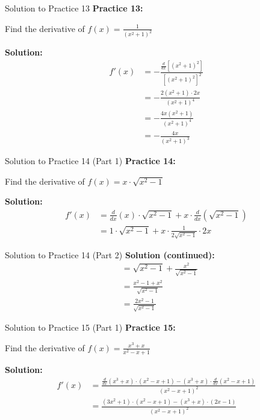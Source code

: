\documentclass[aspectratio=169]{beamer}
\begin{document}
\begin{frame}{Solution to Practice 13}
\textbf{Practice 13:}

Find the derivative of $f(x) = \frac{1}{(x^2 + 1)^2}$

\textbf{Solution:}
\[
\begin{aligned}
  f'(x) &= -\frac{\frac{d}{dx}[(x^2 + 1)^2]}{[(x^2 + 1)^2]^2} \\
  &= -\frac{2(x^2 + 1) \cdot 2x}{(x^2 + 1)^4} \\
  &= -\frac{4x(x^2 + 1)}{(x^2 + 1)^4} \\
  &= -\frac{4x}{(x^2 + 1)^3}
\end{aligned}
\]
\end{frame}

\begin{frame}{Solution to Practice 14 (Part 1)}
\textbf{Practice 14:}

Find the derivative of $f(x) = x \cdot \sqrt{x^2 - 1}$

\textbf{Solution:}
\[
\begin{aligned}
  f'(x) &= \frac{d}{dx}(x) \cdot \sqrt{x^2 - 1} + x \cdot \frac{d}{dx}(\sqrt{x^2 - 1}) \\
  &= 1 \cdot \sqrt{x^2 - 1} + x \cdot \frac{1}{2\sqrt{x^2 - 1}} \cdot 2x
\end{aligned}
\]
\end{frame}

\begin{frame}{Solution to Practice 14 (Part 2)}
\textbf{Solution (continued):}
\[
\begin{aligned}
  &= \sqrt{x^2 - 1} + \frac{x^2}{\sqrt{x^2 - 1}} \\
  &= \frac{x^2 - 1 + x^2}{\sqrt{x^2 - 1}} \\
  &= \frac{2x^2 - 1}{\sqrt{x^2 - 1}}
\end{aligned}
\]
\end{frame}

\begin{frame}{Solution to Practice 15 (Part 1)}
\textbf{Practice 15:}

Find the derivative of $f(x) = \frac{x^3 + x}{x^2 - x + 1}$

\textbf{Solution:}
\[
\begin{aligned}
  f'(x) &= \frac{\frac{d}{dx}(x^3 + x) \cdot (x^2 - x + 1) - (x^3 + x) \cdot \frac{d}{dx}(x^2 - x + 1)}{(x^2 - x + 1)^2} \\
  &= \frac{(3x^2 + 1) \cdot (x^2 - x + 1) - (x^3 + x) \cdot (2x - 1)}{(x^2 - x + 1)^2}
\end{aligned}
\]
\end{frame}
\end{document}
